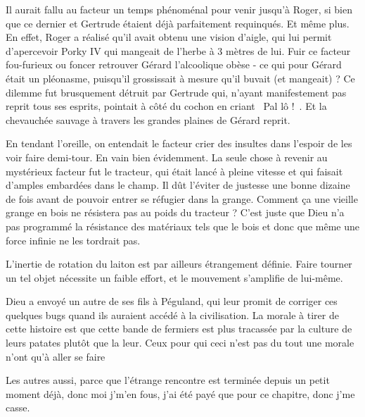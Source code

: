 \documentclass[a5paper, 10pt, twoside]{book}
\newcommand{\cg}{\guillemotleft~}
\newcommand{\cd}{~\guillemotright}
\begin{document}
Il aurait fallu au facteur un temps phénoménal pour venir jusqu'à Roger, si bien que ce dernier et Gertrude étaient déjà parfaitement requinqués. Et même plus. En effet, Roger a réalisé qu'il avait obtenu une vision d'aigle, qui lui permit d'apercevoir Porky IV qui mangeait de l'herbe à 3 mètres de lui. Fuir ce facteur fou-furieux ou foncer retrouver Gérard l'alcoolique obèse - ce qui pour Gérard était un pléonasme, puisqu'il grossissait à mesure qu'il buvait (et mangeait) ? Ce dilemme fut brusquement détruit par Gertrude qui, n'ayant manifestement pas reprit tous ses esprits, pointait à côté du cochon en criant \cg Pal lô !\cd. Et la chevauchée sauvage à travers les grandes plaines de Gérard reprit.

En tendant l'oreille, on entendait le facteur crier des insultes dans l'espoir de les voir faire demi-tour. En vain bien évidemment. La seule chose à revenir au mystérieux facteur fut le tracteur, qui était lancé à pleine vitesse et qui faisait d'amples embardées dans le champ. Il dût l'éviter de justesse une bonne dizaine de fois avant de pouvoir entrer se réfugier dans la grange. Comment ça une vieille grange en bois ne résistera pas au poids du tracteur ? C'est juste que Dieu n'a pas programmé la résistance des matériaux tels que le bois et donc que même une force infinie ne les tordrait pas. 

L'inertie de rotation du laiton est par ailleurs étrangement définie. Faire tourner un tel objet nécessite un faible effort, et le mouvement s'amplifie de lui-même.

Dieu a envoyé un autre de ses fils à Péguland, qui leur promit de corriger ces quelques bugs quand ils auraient accédé à la civilisation. La morale à tirer de cette histoire est que cette bande de fermiers est plus tracassée par la culture de leurs patates plutôt que la leur. Ceux pour qui ceci n'est pas du tout une morale n'ont qu'à aller se faire

Les autres aussi, parce que l'étrange rencontre est terminée depuis un petit moment déjà, donc moi j'm'en fous, j'ai été payé que pour ce chapitre, donc j'me casse.
\end{document}
